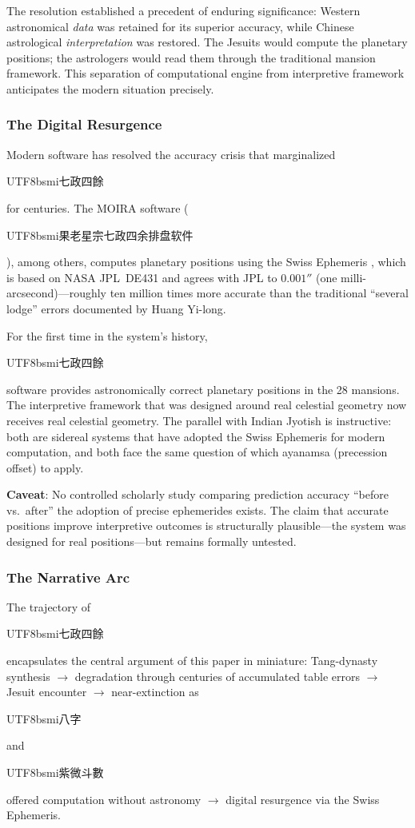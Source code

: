 \documentclass[10pt,a4paper]{article}
\newcommand{\zh}[1]{\begin{CJK}{UTF8}{bsmi}#1\end{CJK}}
\begin{document}
The resolution established a precedent of enduring significance: Western
astronomical \emph{data} was retained for its superior accuracy, while
Chinese astrological \emph{interpretation} was restored. The Jesuits
would compute the planetary positions; the astrologers would read them
through the traditional mansion framework. This separation of
computational engine from interpretive framework anticipates the modern
situation precisely.

\subsubsection{The Digital Resurgence}

Modern software has resolved the accuracy crisis that marginalized
\zh{七政四餘} for centuries. The MOIRA software
(\zh{果老星宗七政四余排盘软件}), among others, computes planetary
positions using the Swiss Ephemeris \cite{swiss_ephemeris}, which is based
on NASA JPL~DE431 and agrees with JPL to $0.001''$ (one
milli-arcsecond)---roughly ten million times more accurate than the
traditional ``several lodge'' errors documented by Huang Yi-long.

For the first time in the system's history, \zh{七政四餘} software
provides astronomically correct planetary positions in the 28 mansions.
The interpretive framework that was designed around real celestial geometry
now receives real celestial geometry. The parallel with Indian
Jyotish is instructive: both are sidereal systems that have adopted the
Swiss Ephemeris for modern computation, and both face the same question
of which ayanamsa (precession offset) to apply.

\textbf{Caveat}: No controlled scholarly study comparing prediction
accuracy ``before vs.\ after'' the adoption of precise ephemerides
exists.  The claim that accurate positions improve interpretive
outcomes is structurally plausible---the system was designed for real
positions---but remains formally untested.

\subsubsection{The Narrative Arc}

The trajectory of \zh{七政四餘} encapsulates the central argument of
this paper in miniature: Tang-dynasty synthesis $\to$ degradation through
centuries of accumulated table errors $\to$ Jesuit encounter $\to$
near-extinction as \zh{八字} and \zh{紫微斗數} offered computation
without astronomy $\to$ digital resurgence via the Swiss Ephemeris.
\end{document}
